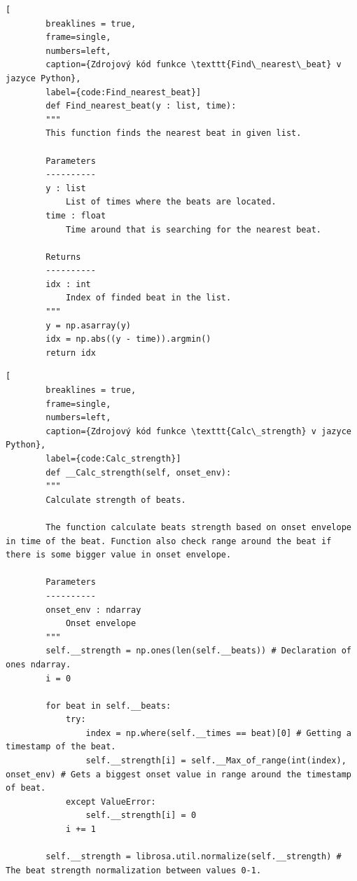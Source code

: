 \begin{minipage}{\linewidth}
	\begin{lstlisting}[
		breaklines = true,
		frame=single,
		numbers=left,
		caption={Zdrojový kód funkce \texttt{Find\_nearest\_beat} v jazyce Python},
		label={code:Find_nearest_beat}]
		def Find_nearest_beat(y : list, time):
		"""
		This function finds the nearest beat in given list.
	
		Parameters
		----------
		y : list
			List of times where the beats are located.
		time : float
			Time around that is searching for the nearest beat.
	
		Returns 
		----------
		idx : int
			Index of finded beat in the list.
		"""
		y = np.asarray(y)
		idx = np.abs((y - time)).argmin() 
		return idx

	\end{lstlisting}
\end{minipage}

\begin{minipage}{\linewidth}
	\begin{lstlisting}[
		breaklines = true,
		frame=single,
		numbers=left,
		caption={Zdrojový kód funkce \texttt{Calc\_strength} v jazyce Python},
		label={code:Calc_strength}]
		def __Calc_strength(self, onset_env):
		"""
		Calculate strength of beats.

		The function calculate beats strength based on onset envelope in time of the beat. Function also check range around the beat if there is some bigger value in onset envelope.

		Parameters
		----------
		onset_env : ndarray
			Onset envelope
		"""
		self.__strength = np.ones(len(self.__beats)) # Declaration of ones ndarray.
		i = 0

		for beat in self.__beats:
			try:
				index = np.where(self.__times == beat)[0] # Getting a timestamp of the beat.
				self.__strength[i] = self.__Max_of_range(int(index), onset_env) # Gets a biggest onset value in range around the timestamp of beat.
			except ValueError:
				self.__strength[i] = 0
			i += 1

		self.__strength = librosa.util.normalize(self.__strength) # The beat strength normalization between values 0-1.
	
	\end{lstlisting}
\end{minipage}

